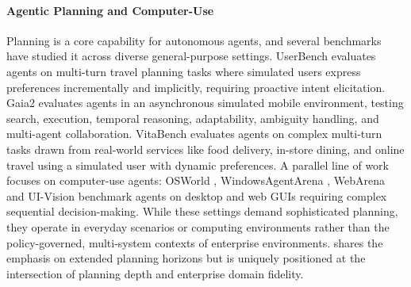 \paragraph{Agentic Planning and Computer-Use}
Planning is a core capability for autonomous agents, and several benchmarks have studied it across diverse general-purpose settings. UserBench \citep{qian2025userbenchinteractivegymenvironment} evaluates agents on multi-turn travel planning tasks where simulated users express preferences incrementally and implicitly, requiring proactive intent elicitation. Gaia2 \citep{froger2025arescalingagentenvironments} evaluates agents in an asynchronous simulated mobile environment, testing search, execution, temporal reasoning, adaptability, ambiguity handling, and multi-agent collaboration. VitaBench \citep{he2025vitabenchbenchmarkingllmagents} evaluates agents on complex multi-turn tasks drawn from real-world services like food delivery, in-store dining, and online travel using a simulated user with dynamic preferences. A parallel line of work focuses on computer-use agents: OSWorld \citep{xie2024osworld}, WindowsAgentArena \citep{bonatti2024arena}, WebArena \citep{zhou2024webarenarealisticwebenvironment} and UI-Vision \citep{nayak2025uivisiondesktopcentricguibenchmark} benchmark agents on desktop and web GUIs requiring complex sequential decision-making. While these settings demand sophisticated planning, they operate in everyday scenarios or computing environments rather than the policy-governed, multi-system contexts of enterprise environments. \ours{} shares the emphasis on extended planning horizons but is uniquely positioned at the intersection of planning depth and enterprise domain fidelity.
